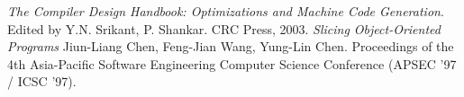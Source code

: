 \documentclass[11pt,a4paper,twoside]{article}
\begin{document}
\begin{thebibliography}{}
 \textit{The Compiler Design Handbook: Optimizations and Machine Code Generation}. Edited by Y.N. Srikant, P. Shankar. CRC Press, 2003.
 \textit{Slicing Object-Oriented Programs} Jiun-Liang Chen, Feng-Jian Wang, Yung-Lin Chen. Proceedings of the 4th Asia-Pacific Software Engineering Computer Science Conference (APSEC '97 / ICSC '97).
\end{thebibliography}
\end{document}
